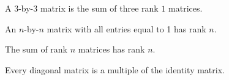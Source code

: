 \documentclass{homework}
\begin{document}
\begin{problem}
  A $3$-by-$3$ matrix is the sum of three rank $1$ matrices.
\end{problem}

\begin{problem}
  An $n$-by-$n$ matrix with all entries equal to 1 has rank $n$.
\end{problem}

\begin{problem}
  The sum of rank $n$ matrices has rank $n$.
\end{problem}

\begin{problem}
  Every diagonal matrix is a multiple of the identity matrix.
\end{problem}
\end{document}
